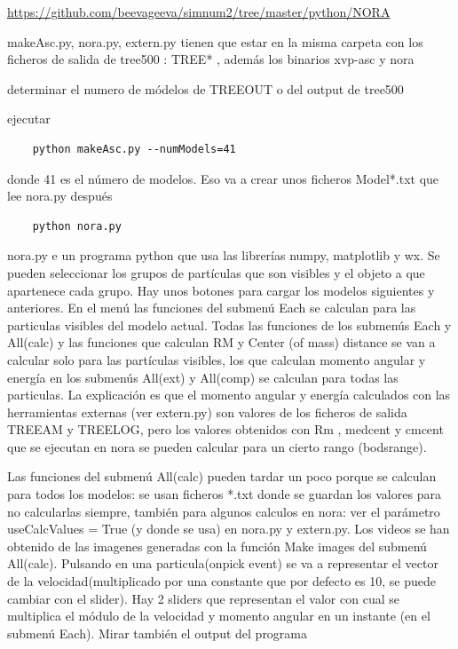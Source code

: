 \documentclass[12pt]{article} %
\renewcommand{\=}[1]{\stackrel{#1}{=}} %
\theoremstyle{definition}
\theoremstyle{remark}
\begin{document}
\begin{description}
\item \url{https://github.com/beevageeva/simnum2/tree/master/python/NORA}
\item makeAsc.py, nora.py, extern.py tienen que estar en la misma carpeta con los ficheros de salida de tree500 : TREE* , además los binarios xvp-asc y nora
\item determinar el numero de módelos de TREEOUT o del output de tree500
\item ejecutar 
\begin{verbatim}
	python makeAsc.py --numModels=41
\end{verbatim}
\item donde 41 es el número de modelos. Eso va a crear unos ficheros Model*.txt  que lee nora.py después
\begin{verbatim}
	python nora.py
\end{verbatim}
\item nora.py e un programa python que usa las librerías numpy, matplotlib y wx.
Se pueden seleccionar los grupos de partículas que son visibles y el objeto a que apartenece cada grupo.
Hay unos botones para cargar los modelos siguientes y anteriores.  
En el menú las funciones del submenú Each se calculan para las particulas visibles del modelo actual. 
Todas las funciones de los submenús  Each y All(calc) y  las funciones que calculan RM y Center (of mass) distance se van a  calcular solo para las partículas visibles, los que calculan momento angular y energía en los submenús All(ext) y All(comp)  se calculan para todas las particulas. 
La explicación es que el momento angular y energía calculados con las herramientas externas (ver extern.py) 
son valores de los ficheros de salida TREEAM y TREELOG, pero los valores obtenidos con Rm , 
medcent y cmcent que se ejecutan en nora se pueden calcular para un cierto rango (bodsrange). 

Las funciones del submenú All(calc) pueden tardar un poco porque se calculan para todos los modelos: se usan ficheros *.txt donde se guardan los valores para no calcularlas siempre, también para algunos calculos en nora: ver el parámetro useCalcValues = True  (y donde se usa) en nora.py y extern.py. 
Los videos se han obtenido de las imagenes generadas con la función Make images del submenú All(calc).
Pulsando en una particula(onpick event) se va a representar el vector de la velocidad(multiplicado por una constante que por defecto es 10, se puede cambiar con el slider).
Hay 2 sliders que representan el valor con cual se multiplica el módulo de la velocidad y momento angular en un instante (en el submenú Each).
Mirar también el output del programa

\end{description}
\end{document}
